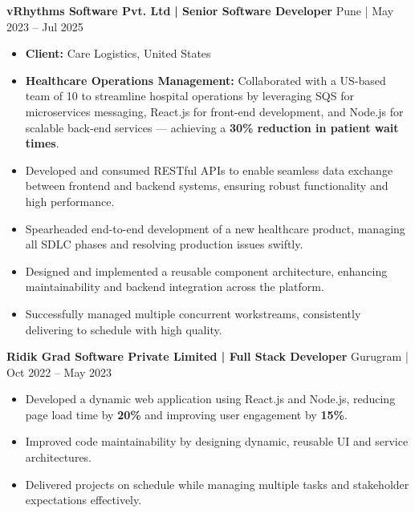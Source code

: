 \documentclass[a4paper]{article}
\begin{document}
      \textbf{vRhythms Software Pvt. Ltd} \textbf{ | Senior Software Developer} \hfill Pune | May 2023 -- Jul 2025 \\
          \vspace{-2mm}
\begin{itemize} \itemsep -3pt
\item[] \textbf{Client:} Care Logistics, United States
\item \textbf{Healthcare Operations Management:} Collaborated with a US-based team of 10 to streamline hospital operations by leveraging SQS for microservices messaging, React.js for front-end development, and Node.js for scalable back-end services — achieving a \textbf{30\% reduction in patient wait times}.
\item Developed and consumed RESTful APIs to enable seamless data exchange between frontend and backend systems, ensuring robust functionality and high performance.
\item Spearheaded end-to-end development of a new healthcare product, managing all SDLC phases and resolving production issues swiftly.
\item Designed and implemented a reusable component architecture, enhancing maintainability and backend integration across the platform.
\item Successfully managed multiple concurrent workstreams, consistently delivering to schedule with high quality.
\end{itemize}
\vspace{3mm}


 \textbf{Ridik Grad Software Private Limited | Full Stack Developer} \hfill Gurugram | Oct 2022 -- May 2023\\
          \vspace{-2mm}
\begin{itemize} \itemsep -3pt
\item Developed a dynamic web application using React.js and Node.js, reducing page load time by \textbf{20\%} and improving user engagement by \textbf{15\%}.
\item Improved code maintainability by designing dynamic, reusable UI and service architectures.
\item Delivered projects on schedule while managing multiple tasks and stakeholder expectations effectively.
\end{itemize}
\vspace{2mm}
\end{document}
